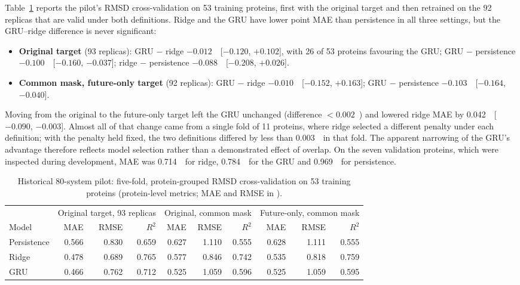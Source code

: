 \documentclass[11pt]{article}
\newcommand{\A}{\text{\AA}}
\begin{document}
Table~\ref{tab:atlas80} reports the pilot's RMSD cross-validation on 53 training proteins, first with the original target and then retrained on the 92 replicas that are valid under both definitions. Ridge and the GRU have lower point MAE than persistence in all three settings, but the GRU--ridge difference is never significant:
\begin{itemize}
\item \textbf{Original target} (93 replicas): GRU $-$ ridge $-0.012$~\A\ [$-0.120$, $+0.102$], with 26 of 53 proteins favouring the GRU; GRU $-$ persistence $-0.100$~\A\ [$-0.160$, $-0.037$]; ridge $-$ persistence $-0.088$~\A\ [$-0.208$, $+0.026$].
\item \textbf{Common mask, future-only target} (92 replicas): GRU $-$ ridge $-0.010$~\A\ [$-0.152$, $+0.163$]; GRU $-$ persistence $-0.103$~\A\ [$-0.164$, $-0.040$].
\end{itemize}
Moving from the original to the future-only target left the GRU unchanged (difference $<0.002$~\A) and lowered ridge MAE by 0.042~\A\ [$-0.090$, $-0.003$]. Almost all of that change came from a single fold of 11 proteins, where ridge selected a different penalty under each definition; with the penalty held fixed, the two definitions differed by less than 0.003~\A\ in that fold. The apparent narrowing of the GRU's advantage therefore reflects model selection rather than a demonstrated effect of overlap. On the seven validation proteins, which were inspected during development, MAE was 0.714~\A\ for ridge, 0.784~\A\ for the GRU and 0.969~\A\ for persistence.

\begin{table}[ht]
\centering
\small
\caption{Historical 80-system pilot: five-fold, protein-grouped RMSD cross-validation on 53 training proteins (protein-level metrics; MAE and RMSE in \A).}
\label{tab:atlas80}
\begin{tabular}{lrrrrrrrrr}
\toprule
 & \multicolumn{3}{c}{Original target, 93 replicas} & \multicolumn{3}{c}{Original, common mask} & \multicolumn{3}{c}{Future-only, common mask} \\
\cmidrule(lr){2-4}\cmidrule(lr){5-7}\cmidrule(lr){8-10}
Model & MAE & RMSE & $R^2$ & MAE & RMSE & $R^2$ & MAE & RMSE & $R^2$ \\
\midrule
Persistence & 0.566 & 0.830 & 0.659 & 0.627 & 1.110 & 0.555 & 0.628 & 1.111 & 0.555 \\
Ridge       & 0.478 & 0.689 & 0.765 & 0.577 & 0.846 & 0.742 & 0.535 & 0.818 & 0.759 \\
GRU         & 0.466 & 0.762 & 0.712 & 0.525 & 1.059 & 0.596 & 0.525 & 1.059 & 0.595 \\
\bottomrule
\end{tabular}
\end{table}
\end{document}
